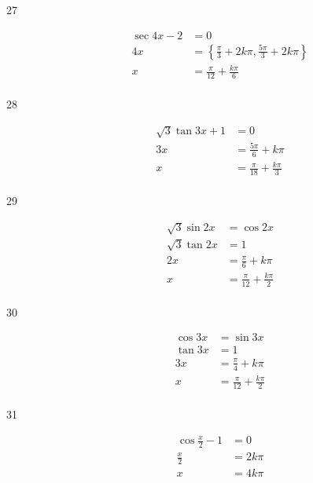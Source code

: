 \documentclass{exam}
\begin{document}
\begin{description}
      \item[27] 
        \begin{align*}
          \sec 4x - 2 & = 0 \\
          4x          & = \left\{ \frac{\pi}{3} + 2k \pi, \frac{5 \pi}{3} + 2k \pi \right\} \\
          x           & = \boxed{ \frac{\pi}{12} + \frac{k \pi}{6} } \\
        \end{align*}

      \item[28] 
        \begin{align*}
          \sqrt{3} \tan 3x + 1 & = 0 \\
          3x                   & = \frac{5 \pi}{6} + k \pi \\
          x                    & = \boxed{ \frac{\pi}{18} + \frac{k \pi}{3} } \\
        \end{align*}

      \item[29] 
        \begin{align*}
          \sqrt{3} \sin 2x & = \cos 2x \\
          \sqrt{3} \tan 2x & = 1 \\
          2x               & = \frac{\pi}{6} + k \pi \\
          x                & = \boxed{ \frac{\pi}{12} + \frac{k \pi}{2} } \\
        \end{align*}

      \item[30] 
        \begin{align*}
          \cos 3x & = \sin 3x \\
          \tan 3x & = 1 \\
          3x      & = \frac{\pi}{4} + k \pi \\
          x       & = \boxed{ \frac{\pi}{12} + \frac{k \pi}{2} } \\
        \end{align*}

      \item[31] 
        \begin{align*}
          \cos \frac{x}{2} - 1 & = 0 \\
          \frac{x}{2}          & = 2k \pi \\
          x                    & = \boxed{ 4k \pi } \\
        \end{align*}


\end{description}
\end{document}
